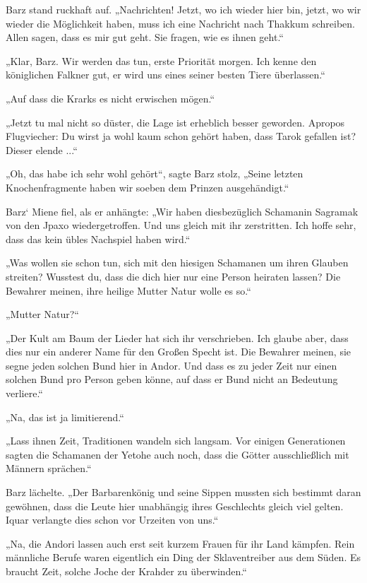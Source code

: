 Barz stand ruckhaft auf. „Nachrichten! Jetzt, wo ich wieder hier bin, jetzt, wo wir wieder die Möglichkeit haben, muss ich eine Nachricht nach Thakkum schreiben. Allen sagen, dass es mir gut geht. Sie fragen, wie es ihnen geht.“

„Klar, Barz. Wir werden das tun, erste Priorität morgen. Ich kenne den königlichen Falkner gut, er wird uns eines seiner besten Tiere überlassen.“

„Auf dass die Krarks es nicht erwischen mögen.“

„Jetzt tu mal nicht so düster, die Lage ist erheblich besser geworden. Apropos Flugviecher: Du wirst ja wohl kaum schon gehört haben, dass Tarok gefallen ist? Dieser elende ...“

„Oh, das habe ich sehr wohl gehört“, sagte Barz stolz, „Seine letzten Knochenfragmente haben wir soeben dem Prinzen ausgehändigt.“

Barz‘ Miene fiel, als er anhängte: „Wir haben diesbezüglich Schamanin Sagramak von den Jpaxo wiedergetroffen. Und uns gleich mit ihr zerstritten. Ich hoffe sehr, dass das kein übles Nachspiel haben wird.“

„Was wollen sie schon tun, sich mit den hiesigen Schamanen um ihren Glauben streiten? Wusstest du, dass die dich hier nur eine Person heiraten lassen? Die Bewahrer meinen, ihre heilige Mutter Natur wolle es so.“

„Mutter Natur?“

„Der Kult am Baum der Lieder hat sich ihr verschrieben. Ich glaube aber, dass dies nur ein anderer Name für den Großen Specht ist. Die Bewahrer meinen, sie segne jeden solchen Bund hier in Andor. Und dass es zu jeder Zeit nur einen solchen Bund pro Person geben könne, auf dass er Bund nicht an Bedeutung verliere.“

„Na, das ist ja limitierend.“

„Lass ihnen Zeit, Traditionen wandeln sich langsam. Vor einigen Generationen sagten die Schamanen der Yetohe auch noch, dass die Götter ausschließlich mit Männern sprächen.“

Barz lächelte. „Der Barbarenkönig und seine Sippen mussten sich bestimmt daran gewöhnen, dass die Leute hier unabhängig ihres Geschlechts gleich viel gelten. Iquar verlangte dies schon vor Urzeiten von uns.“

„Na, die Andori lassen auch erst seit kurzem Frauen für ihr Land kämpfen. Rein männliche Berufe waren eigentlich ein Ding der Sklaventreiber aus dem Süden. Es braucht Zeit, solche Joche der Krahder zu überwinden.“

